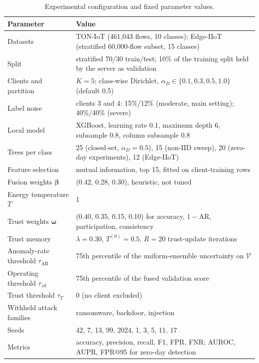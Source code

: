 \documentclass[pdflatex,sn-mathphys-num]{sn-jnl}
\begin{document}
{{\begin{table}[!htbp]\centering
\caption{Experimental configuration and fixed parameter values.}\label{tab:config}
\footnotesize
\begin{tabular}{p{}p{}}\toprule
Parameter & Value \\ \midrule
Datasets & TON-IoT (461{,}043 flows, 10 classes); Edge-IIoT (stratified 60{,}000-flow subset, 15 classes) \\
Split & stratified 70/30 train/test; 10\% of the training split held by the server as validation \\
Clients and partition & $K=5$; class-wise Dirichlet, $\alpha_D\in\{0.1,0.3,0.5,1.0\}$ (default 0.5) \\
Label noise & clients 3 and 4: 15\%/12\% (moderate, main setting); 40\%/40\% (severe) \\
Local model & XGBoost, learning rate 0.1, maximum depth 6, subsample 0.8, column subsample 0.8 \\
Trees per class & 25 (closed-set, $\alpha_D=0.5$), 15 (non-IID sweep), 20 (zero-day experiments), 12 (Edge-IIoT) \\
Feature selection & mutual information, top 15, fitted on client-training rows \\
Fusion weights $\boldsymbol\beta$ & (0.42, 0.28, 0.30), heuristic, not tuned \\
Energy temperature $T$ & 1 \\
Trust weights $\boldsymbol\omega$ & (0.40, 0.35, 0.15, 0.10) for accuracy, $1-\mathrm{AR}$, participation, consistency \\
Trust memory & $\lambda=0.30$, $T^{(0)}=0.5$, $R=20$ trust-update iterations \\
Anomaly-rate threshold $\tau_{\mathrm{AR}}$ & 75th percentile of the uniform-ensemble uncertainty on $\mathcal{V}$ \\
Operating threshold $\tau_{zd}$ & 75th percentile of the fused validation score \\
Trust threshold $\tau_T$ & 0 (no client excluded) \\
Withheld attack families & ransomware, backdoor, injection \\
Seeds & 42, 7, 13, 99, 2024, 1, 3, 5, 11, 17 \\
Metrics & accuracy, precision, recall, F1, FPR, FNR; AUROC, AUPR, FPR@95 for zero-day detection \\
\bottomrule\end{tabular}
\end{table}}
{\color{black}
}}
\end{document}

